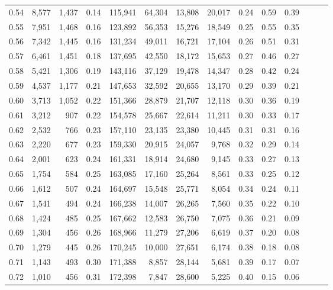 \begin{tabular}{rrrrrrrrrrrrrr}
0.54 &  8,577 &  1,437 &  0.14 &  115,941 &   64,304 &  13,808 &  20,017 &  0.24 &  0.59 &      0.39 \\
0.55 &  7,951 &  1,468 &  0.16 &  123,892 &   56,353 &  15,276 &  18,549 &  0.25 &  0.55 &      0.35 \\
0.56 &  7,342 &  1,445 &  0.16 &  131,234 &   49,011 &  16,721 &  17,104 &  0.26 &  0.51 &      0.31 \\
0.57 &  6,461 &  1,451 &  0.18 &  137,695 &   42,550 &  18,172 &  15,653 &  0.27 &  0.46 &      0.27 \\
0.58 &  5,421 &  1,306 &  0.19 &  143,116 &   37,129 &  19,478 &  14,347 &  0.28 &  0.42 &      0.24 \\
0.59 &  4,537 &  1,177 &  0.21 &  147,653 &   32,592 &  20,655 &  13,170 &  0.29 &  0.39 &      0.21 \\
0.60 &  3,713 &  1,052 &  0.22 &  151,366 &   28,879 &  21,707 &  12,118 &  0.30 &  0.36 &      0.19 \\
0.61 &  3,212 &    907 &  0.22 &  154,578 &   25,667 &  22,614 &  11,211 &  0.30 &  0.33 &      0.17 \\
0.62 &  2,532 &    766 &  0.23 &  157,110 &   23,135 &  23,380 &  10,445 &  0.31 &  0.31 &      0.16 \\
0.63 &  2,220 &    677 &  0.23 &  159,330 &   20,915 &  24,057 &   9,768 &  0.32 &  0.29 &      0.14 \\
0.64 &  2,001 &    623 &  0.24 &  161,331 &   18,914 &  24,680 &   9,145 &  0.33 &  0.27 &      0.13 \\
0.65 &  1,754 &    584 &  0.25 &  163,085 &   17,160 &  25,264 &   8,561 &  0.33 &  0.25 &      0.12 \\
0.66 &  1,612 &    507 &  0.24 &  164,697 &   15,548 &  25,771 &   8,054 &  0.34 &  0.24 &      0.11 \\
0.67 &  1,541 &    494 &  0.24 &  166,238 &   14,007 &  26,265 &   7,560 &  0.35 &  0.22 &      0.10 \\
0.68 &  1,424 &    485 &  0.25 &  167,662 &   12,583 &  26,750 &   7,075 &  0.36 &  0.21 &      0.09 \\
0.69 &  1,304 &    456 &  0.26 &  168,966 &   11,279 &  27,206 &   6,619 &  0.37 &  0.20 &      0.08 \\
0.70 &  1,279 &    445 &  0.26 &  170,245 &   10,000 &  27,651 &   6,174 &  0.38 &  0.18 &      0.08 \\
0.71 &  1,143 &    493 &  0.30 &  171,388 &    8,857 &  28,144 &   5,681 &  0.39 &  0.17 &      0.07 \\
0.72 &  1,010 &    456 &  0.31 &  172,398 &    7,847 &  28,600 &   5,225 &  0.40 &  0.15 &      0.06 \\

\end{tabular}
